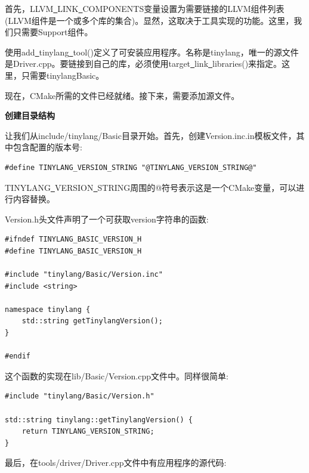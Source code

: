 首先，LLVM\underline{~}LINK\underline{~}COMPONENTS变量设置为需要链接的LLVM组件列表(LLVM组件是一个或多个库的集合)。显然，这取决于工具实现的功能。这里，我们只需要Support组件。\par

使用add\underline{~}tinylang\underline{~}tool()定义了可安装应用程序。名称是tinylang，唯一的源文件是Driver.cpp。要链接到自己的库，必须使用target\underline{~}link\underline{~}libraries()来指定。这里，只需要tinylangBasic。\par

现在，CMake所需的文件已经就绪。接下来，需要添加源文件。\par

\hspace*{\fill} \par %
\textbf{创建目录结构}

让我们从include/tinylang/Basic目录开始。首先，创建Version.inc.in模板文件，其中包含配置的版本号:\par

\begin{lstlisting}[caption={}]
#define TINYLANG_VERSION_STRING "@TINYLANG_VERSION_STRING@"
\end{lstlisting}

TINYLANG\underline{~}VERSION\underline{~}STRING周围的@符号表示这是一个CMake变量，可以进行内容替换。\par

Version.h头文件声明了一个可获取version字符串的函数:\par

\begin{lstlisting}[caption={}]
#ifndef TINYLANG_BASIC_VERSION_H
#define TINYLANG_BASIC_VERSION_H

#include "tinylang/Basic/Version.inc"
#include <string>

namespace tinylang {
	std::string getTinylangVersion();
}

#endif
\end{lstlisting}

这个函数的实现在lib/Basic/Version.cpp文件中。同样很简单:\par

\begin{lstlisting}[caption={}]
#include "tinylang/Basic/Version.h"

std::string tinylang::getTinylangVersion() {
	return TINYLANG_VERSION_STRING;
}
\end{lstlisting}

最后，在tools/driver/Driver.cpp文件中有应用程序的源代码:\par


